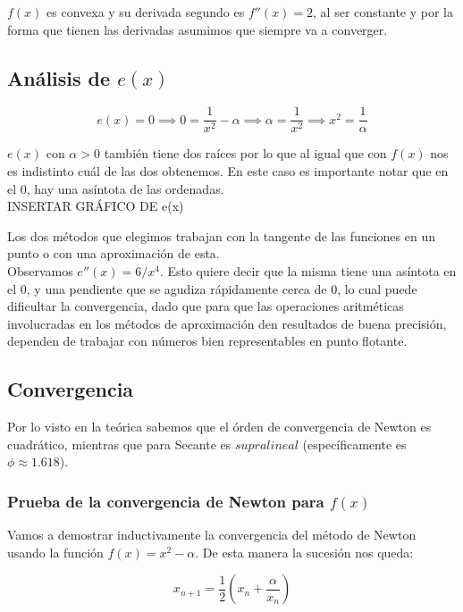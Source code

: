 $f(x)$ es convexa y su derivada segundo es $f''(x) = 2$, al ser constante y por la
forma que tienen las derivadas asumimos que siempre va a converger.

\subsection{Análisis de $e(x)$}

\begin{displaymath}
    e(x) = 0 \implies 0 = \frac{1}{x^2} - \alpha \implies \alpha = \frac{1}{x^2} \implies x^2 = \frac{1}{\alpha}
\end{displaymath}

$e(x)$ con $\alpha > 0$ también tiene dos raíces por lo que al igual que con
$f(x)$ nos es indistinto cuál de las dos obtenemos. En este caso es importante
notar que en el 0, hay una asíntota de las ordenadas.\\

INSERTAR GRÁFICO DE e(x)
 
Los dos métodos que elegimos trabajan con la tangente de las funciones en un
punto o con una aproximación de esta.\\

Observamos $e''(x) = 6/x^4$. Esto quiere decir que la misma tiene una asíntota en el 0,
y una pendiente que se agudiza rápidamente cerca de 0, lo cual puede dificultar la convergencia,
dado que para que las operaciones aritméticas involucradas en los métodos de aproximación 
den resultados de buena precisión, dependen de trabajar con números bien representables en punto flotante.

\subsection{Convergencia}
Por lo visto en la teórica sabemos que el órden de convergencia de Newton es cuadrático, mientras que para Secante es $supralineal$ (específicamente es $\phi \approx 1.618$).

\subsubsection{Prueba de la convergencia de Newton para $f(x)$}
Vamos a demostrar inductivamente la convergencia del método de Newton usando la función $\displaystyle f(x) = x^2 - \alpha$. De esta manera la sucesión nos queda:

\begin{displaymath}
    x_{n + 1} = \frac{1}{2}(x_n + \frac{\alpha}{x_n})
\end{displaymath}

